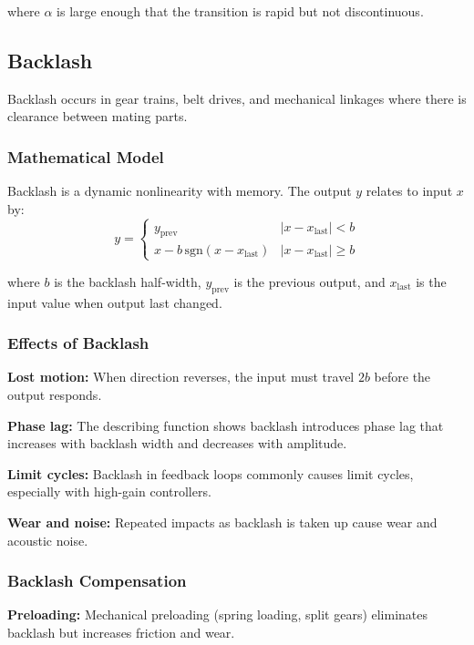 where $\alpha$ is large enough that the transition is rapid but not discontinuous.

\subsection{Backlash}

Backlash occurs in gear trains, belt drives, and mechanical linkages where there is clearance between mating parts.

\subsubsection{Mathematical Model}

Backlash is a dynamic nonlinearity with memory. The output $y$ relates to input $x$ by:
\begin{equation}
y = \begin{cases}
y_{\text{prev}} & |x - x_{\text{last}}| < b \\
x - b\,\text{sgn}(x - x_{\text{last}}) & |x - x_{\text{last}}| \geq b
\end{cases}
\label{eq:backlash_model}
\end{equation}

where $b$ is the backlash half-width, $y_{\text{prev}}$ is the previous output, and $x_{\text{last}}$ is the input value when output last changed.

\subsubsection{Effects of Backlash}

\textbf{Lost motion:} When direction reverses, the input must travel $2b$ before the output responds.

\textbf{Phase lag:} The describing function shows backlash introduces phase lag that increases with backlash width and decreases with amplitude.

\textbf{Limit cycles:} Backlash in feedback loops commonly causes limit cycles, especially with high-gain controllers.

\textbf{Wear and noise:} Repeated impacts as backlash is taken up cause wear and acoustic noise.

\subsubsection{Backlash Compensation}

\textbf{Preloading:} Mechanical preloading (spring loading, split gears) eliminates backlash but increases friction and wear.

